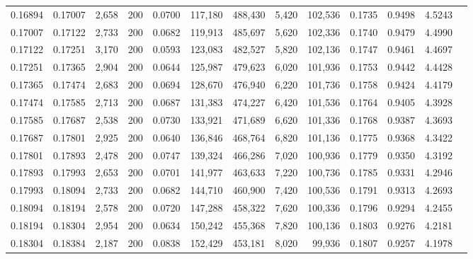 \begin{tabular}{rrrrrrrrrrrrr}
0.16894 & 0.17007 & 2,658 & 200 &                                     0.0700 & 117,180 & 488,430 &   5,420 & 102,536 & 0.1735 & 0.9498 & 4.5243 \\
0.17007 & 0.17122 & 2,733 & 200 &                                     0.0682 & 119,913 & 485,697 &   5,620 & 102,336 & 0.1740 & 0.9479 & 4.4990 \\
0.17122 & 0.17251 & 3,170 & 200 &                                     0.0593 & 123,083 & 482,527 &   5,820 & 102,136 & 0.1747 & 0.9461 & 4.4697 \\
0.17251 & 0.17365 & 2,904 & 200 &                                     0.0644 & 125,987 & 479,623 &   6,020 & 101,936 & 0.1753 & 0.9442 & 4.4428 \\
0.17365 & 0.17474 & 2,683 & 200 &                                     0.0694 & 128,670 & 476,940 &   6,220 & 101,736 & 0.1758 & 0.9424 & 4.4179 \\
0.17474 & 0.17585 & 2,713 & 200 &                                     0.0687 & 131,383 & 474,227 &   6,420 & 101,536 & 0.1764 & 0.9405 & 4.3928 \\
0.17585 & 0.17687 & 2,538 & 200 &                                     0.0730 & 133,921 & 471,689 &   6,620 & 101,336 & 0.1768 & 0.9387 & 4.3693 \\
0.17687 & 0.17801 & 2,925 & 200 &                                     0.0640 & 136,846 & 468,764 &   6,820 & 101,136 & 0.1775 & 0.9368 & 4.3422 \\
0.17801 & 0.17893 & 2,478 & 200 &                                     0.0747 & 139,324 & 466,286 &   7,020 & 100,936 & 0.1779 & 0.9350 & 4.3192 \\
0.17893 & 0.17993 & 2,653 & 200 &                                     0.0701 & 141,977 & 463,633 &   7,220 & 100,736 & 0.1785 & 0.9331 & 4.2946 \\
0.17993 & 0.18094 & 2,733 & 200 &                                     0.0682 & 144,710 & 460,900 &   7,420 & 100,536 & 0.1791 & 0.9313 & 4.2693 \\
0.18094 & 0.18194 & 2,578 & 200 &                                     0.0720 & 147,288 & 458,322 &   7,620 & 100,336 & 0.1796 & 0.9294 & 4.2455 \\
0.18194 & 0.18304 & 2,954 & 200 &                                     0.0634 & 150,242 & 455,368 &   7,820 & 100,136 & 0.1803 & 0.9276 & 4.2181 \\
0.18304 & 0.18384 & 2,187 & 200 &                                     0.0838 & 152,429 & 453,181 &   8,020 &  99,936 & 0.1807 & 0.9257 & 4.1978 \\

\end{tabular}
